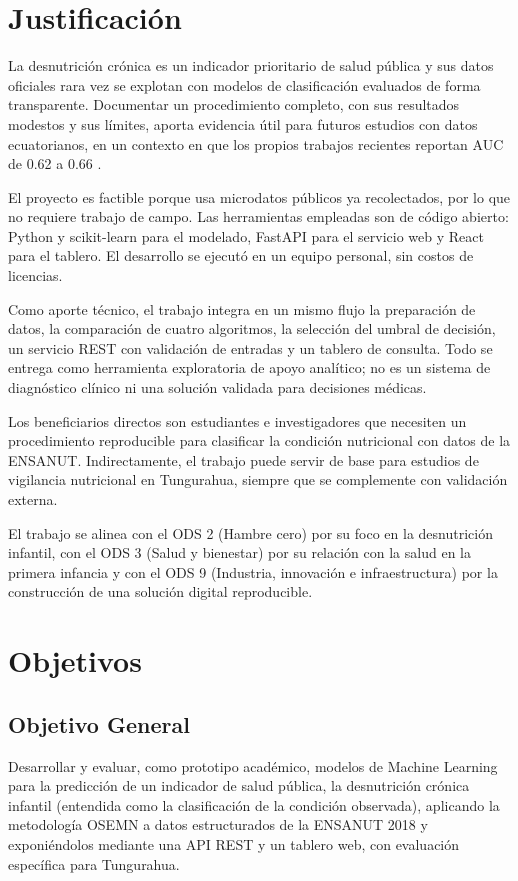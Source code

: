 \section{Justificación}
La desnutrición crónica es un indicador prioritario de salud pública y sus datos oficiales rara vez se explotan con modelos de clasificación evaluados de forma transparente. Documentar un procedimiento completo, con sus resultados modestos y sus límites, aporta evidencia útil para futuros estudios con datos ecuatorianos, en un contexto en que los propios trabajos recientes reportan AUC de 0.62 a 0.66 \cite{nu18142232}.

El proyecto es factible porque usa microdatos públicos ya recolectados, por lo que no requiere trabajo de campo. Las herramientas empleadas son de código abierto: Python y scikit-learn para el modelado, FastAPI para el servicio web y React para el tablero. El desarrollo se ejecutó en un equipo personal, sin costos de licencias.

Como aporte técnico, el trabajo integra en un mismo flujo la preparación de datos, la comparación de cuatro algoritmos, la selección del umbral de decisión, un servicio REST con validación de entradas y un tablero de consulta. Todo se entrega como herramienta exploratoria de apoyo analítico; no es un sistema de diagnóstico clínico ni una solución validada para decisiones médicas.

Los beneficiarios directos son estudiantes e investigadores que necesiten un procedimiento reproducible para clasificar la condición nutricional con datos de la ENSANUT. Indirectamente, el trabajo puede servir de base para estudios de vigilancia nutricional en Tungurahua, siempre que se complemente con validación externa.

El trabajo se alinea con el ODS 2 (Hambre cero) por su foco en la desnutrición infantil, con el ODS 3 (Salud y bienestar) por su relación con la salud en la primera infancia y con el ODS 9 (Industria, innovación e infraestructura) por la construcción de una solución digital reproducible.

\section{Objetivos}
\subsection{Objetivo General}
Desarrollar y evaluar, como prototipo académico, modelos de Machine Learning para la predicción de un indicador de salud pública, la desnutrición crónica infantil (entendida como la clasificación de la condición observada), aplicando la metodología OSEMN a datos estructurados de la ENSANUT 2018 y exponiéndolos mediante una API REST y un tablero web, con evaluación específica para Tungurahua.

